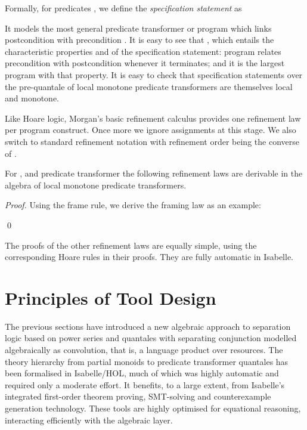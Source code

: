 \documentclass[twoside,runningheads,envcountsame,envcountsect,oribibl,orivec]{llncs}
\begin{document}
 Formally, for predicates , we define
 the \emph{specification statement} as

It models the most general predicate transformer or program which
links postcondition  with precondition . It is easy to see that
, which entails the
characteristic properties  and
 of the specification
statement: program  relates precondition  with
postcondition  whenever it terminates; and it is the largest
program with that property. It is easy to check that specification
statements over the pre-quantale of local monotone predicate
transformers are themselves local and monotone.

Like Hoare logic, Morgan's basic refinement calculus provides one
refinement law per program construct. Once more we ignore assignments
at this stage. We also switch to standard refinement notation with
refinement order  being the converse of . 

\begin{proposition}\label{P:morganderive}
  For , and predicate
  transformer  the following refinement laws are derivable in the
  algebra of local monotone predicate transformers.

\end{proposition}
\begin{proof} 
Using the frame rule, we derive the framing law as an example:
 
\qed
\end{proof}
The proofs of the other refinement laws are equally simple, using the
corresponding Hoare rules in their proofs.  They are fully automatic
in Isabelle.



\section{Principles of Tool Design}\label{S:tool_design}

The previous sections have introduced a new algebraic approach to
separation logic based on power series and quantales with separating
conjunction modelled algebraically as convolution, that is, a language
product over resources. The theory hierarchy from partial monoids to
predicate transformer quantales has been formalised in Isabelle/HOL,
much of which was highly automatic and required only a moderate
effort. It benefits, to a large extent, from Isabelle's integrated
first-order theorem proving, SMT-solving and counterexample generation
technology.  These tools are highly optimised for equational
reasoning, interacting efficiently with the algebraic layer.
\end{document}
